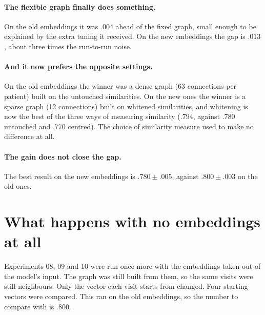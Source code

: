 \documentclass[11pt]{article}
\begin{document}
\paragraph{The flexible graph finally does something.} On the old embeddings it was $.004$
ahead of the fixed graph, small enough to be explained by the extra tuning it received. On the
new embeddings the gap is $.013$, about three times the run-to-run noise.

\paragraph{And it now prefers the opposite settings.} On the old embeddings the winner was a
dense graph (63 connections per patient) built on the untouched similarities. On the new ones
the winner is a sparse graph (12 connections) built on whitened similarities, and whitening is
now the best of the three ways of measuring similarity ($.794$, against $.780$ untouched and
$.770$ centred). The choice of similarity measure used to make no difference at all.

\paragraph{The gain does not close the gap.} The best result on the new embeddings is
$.780 \pm .005$, against $.800 \pm .003$ on the old ones.

\section*{What happens with no embeddings at all}

Experiments 08, 09 and 10 were run once more with the embeddings taken out of the model's
input. The graph was still built from them, so the same visits were still neighbours. Only the
vector each visit starts from changed. Four starting vectors were compared. This ran on the old
embeddings, so the number to compare with is $.800$.
\end{document}
